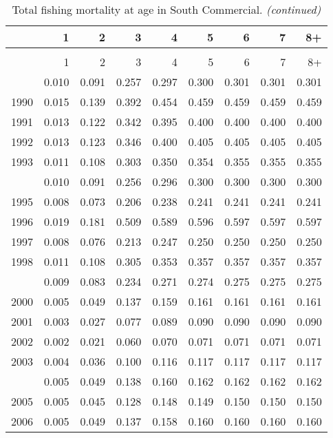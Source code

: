 \documentclass[
]{article}
\begin{document}
\begin{longtable}[t]{lrrrrrrrr}
\caption{\label{tab:South_Commercial-fleet-FAA-table}Total fishing mortality at age in South Commercial.}\\
\toprule
  & 1 & 2 & 3 & 4 & 5 & 6 & 7 & 8+\\
\midrule
\endfirsthead
\caption[]{Total fishing mortality at age in South Commercial. \textit{(continued)}}\\
\toprule
  & 1 & 2 & 3 & 4 & 5 & 6 & 7 & 8+\\
\midrule
\endhead

\endfoot
\bottomrule
\endlastfoot
1989 & 0.010 & 0.091 & 0.257 & 0.297 & 0.300 & 0.301 & 0.301 & 0.301\\
1990 & 0.015 & 0.139 & 0.392 & 0.454 & 0.459 & 0.459 & 0.459 & 0.459\\
1991 & 0.013 & 0.122 & 0.342 & 0.395 & 0.400 & 0.400 & 0.400 & 0.400\\
1992 & 0.013 & 0.123 & 0.346 & 0.400 & 0.405 & 0.405 & 0.405 & 0.405\\
1993 & 0.011 & 0.108 & 0.303 & 0.350 & 0.354 & 0.355 & 0.355 & 0.355\\
\addlinespace
1994 & 0.010 & 0.091 & 0.256 & 0.296 & 0.300 & 0.300 & 0.300 & 0.300\\
1995 & 0.008 & 0.073 & 0.206 & 0.238 & 0.241 & 0.241 & 0.241 & 0.241\\
1996 & 0.019 & 0.181 & 0.509 & 0.589 & 0.596 & 0.597 & 0.597 & 0.597\\
1997 & 0.008 & 0.076 & 0.213 & 0.247 & 0.250 & 0.250 & 0.250 & 0.250\\
1998 & 0.011 & 0.108 & 0.305 & 0.353 & 0.357 & 0.357 & 0.357 & 0.357\\
\addlinespace
1999 & 0.009 & 0.083 & 0.234 & 0.271 & 0.274 & 0.275 & 0.275 & 0.275\\
2000 & 0.005 & 0.049 & 0.137 & 0.159 & 0.161 & 0.161 & 0.161 & 0.161\\
2001 & 0.003 & 0.027 & 0.077 & 0.089 & 0.090 & 0.090 & 0.090 & 0.090\\
2002 & 0.002 & 0.021 & 0.060 & 0.070 & 0.071 & 0.071 & 0.071 & 0.071\\
2003 & 0.004 & 0.036 & 0.100 & 0.116 & 0.117 & 0.117 & 0.117 & 0.117\\
\addlinespace
2004 & 0.005 & 0.049 & 0.138 & 0.160 & 0.162 & 0.162 & 0.162 & 0.162\\
2005 & 0.005 & 0.045 & 0.128 & 0.148 & 0.149 & 0.150 & 0.150 & 0.150\\
2006 & 0.005 & 0.049 & 0.137 & 0.158 & 0.160 & 0.160 & 0.160 & 0.160\\

\end{longtable}
\end{document}
